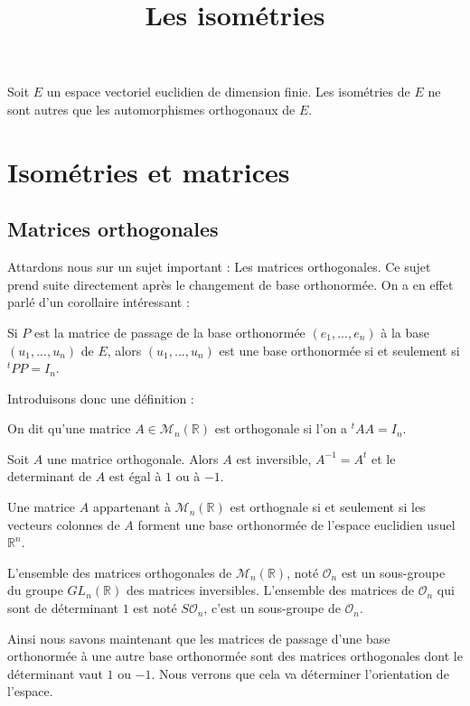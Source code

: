 \documentclass[12pt,a4paper]{article}
\title{Les isométries}
\newcommand{\R}{\mathbb{R}}
\newcommand{\Can}{(e_1,...,e_n)}
\newcommand{\Mat}{\mathcal{M}_n(\R)}
\newcommand{\Oo}{\mathcal{O}}
\begin{document}
\maketitle

\begin{df}
Soit $E$ un espace vectoriel euclidien de dimension finie. Les isométries de $E$ ne sont autres que les automorphismes orthogonaux de $E$.
\end{df}
\section{Isométries et matrices}
\subsection{Matrices orthogonales}
Attardons nous sur un sujet important : Les matrices orthogonales. Ce sujet prend suite directement après le changement de base orthonormée. On a en effet parlé d'un corollaire intéressant : 
\begin{coro}
Si $P$ est la matrice de passage de la base orthonormée $\Can$ à la base $(u_1,...,u_n)$ de $E$, alors $(u_1,...,u_n)$ est une base orthonormée si et seulement si $^tPP = I_n$.
\end{coro}
Introduisons donc une définition :
\begin{df}
On dit qu'une matrice $A \in \Mat$ est orthogonale si l'on a $^tAA = I_n$.
\end{df}
\begin{prop}
Soit $A$ une matrice orthogonale. Alors $A$ est inversible, $A^{-1}=A^t$ et le determinant de $A$ est égal à $1$ ou à $-1$.
\end{prop}

\begin{prop}
Une matrice $A$ appartenant à $\Mat$ est orthognale si et seulement si les vecteurs colonnes de $A$ forment une base orthonormée de l'espace euclidien usuel $\R^n$.
\end{prop}

\begin{prop}
L'ensemble des matrices orthogonales de $\Mat$, noté $\Oo_n$ est un sous-groupe du groupe $GL_n(\R)$ des matrices inversibles.
L'ensemble des matrices de $\Oo_n$ qui sont de déterminant $1$ est noté $S\Oo_n$, c'est un sous-groupe de $\Oo_n$.
\end{prop}

Ainsi nous savons maintenant que les matrices de passage d'une base orthonormée à une autre base orthonormée sont des matrices orthogonales dont le déterminant vaut $1$ ou $-1$. Nous verrons que cela va déterminer l'orientation de l'espace.
\end{document}
